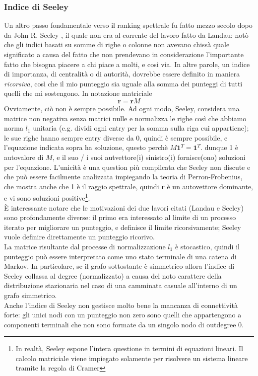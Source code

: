 \subsubsection{Indice di Seeley}
Un altro passo fondamentale verso il ranking spettrale fu fatto mezzo secolo dopo da John R. Seeley %
, il quale non era al corrente del lavoro fatto da Landau: notò che gli indici basati su somme di righe o colonne non avevano chissà quale significato a causa del fatto che non prendevano in considerazione l'importante fatto che bisogna piacere a chi piace a molti, e così via. In altre parole, un indice di importanza, di centralità o di autorità, dovrebbe essere definito in maniera \textit{ricorsiva}, così che il mio punteggio sia uguale alla somma dei punteggi di tutti quelli che mi sostengono. In notazione matriciale
\begin{equation*}
    \textbf{r} = \textbf{r}M
\end{equation*}
Ovviamente, ciò non è sempre possibile. Ad ogni modo, Seeley, considera una matrice non negativa senza matrici nulle e normalizza le righe così che abbiamo norma $l_1$ unitaria (e.g. dividi ogni entry per la somma sulla riga cui appartiene); le sue righe hanno sempre entry diverse da 0, quindi è sempre possibile, e l'equazione indicata sopra ha soluzione, questo perchè $M\textbf{1}^T = \textbf{1}^T$. dunque 1 è autovalore di $M$, e il suo / i suoi autvettore(i) sinistro(i) fornisce(ono) soluzioni per l'equazione. L'unicità è una question più compilcata che Seeley non discute e che può essere facilmente analizzata impiegando la teoria di Perron-Frobenius, che mostra anche che 1 è il raggio spettrale, quindi \textbf{r} è  un autovettore dominante, e vi sono soluzioni positive\footnote{In realtà, Seeley espone l'intera questione in termini di equazioni lineari. Il calcolo matriciale viene impiegato solamente per risolvere un sistema lineare tramite la regola di Cramer}.\\
È interessante notare che le motivazioni dei due lavori citati (Landau e Seeley) sono profondamente diverse: il primo era interessato al limite di un processo iterato per migliorare un punteggio, e definisce il limite ricorsivamente; Seeley vuole definire direttamente un punteggio ricorivo.\\
La matrice risultante dal processe di normalizzazione $l_1$ è stocastico, quindi il punteggio può essere interpretato come uno stato terminale di una catena di Markov. In particolare, se il grafo sottostante è simmetrico allora l'indice di Seeley collassa al degree (normalizzato) a causa del noto carattere della distribuzione stazionaria nel caso di una camminata casuale all'interno di un grafo simmetrico.\\
Anche l'indice di Seeley non gestisce molto bene la mancanza di connettività forte: gli unici nodi con un punteggio non zero sono quelli che appartengono a componenti terminali che non sono formate da un singolo nodo di outdegree 0.
